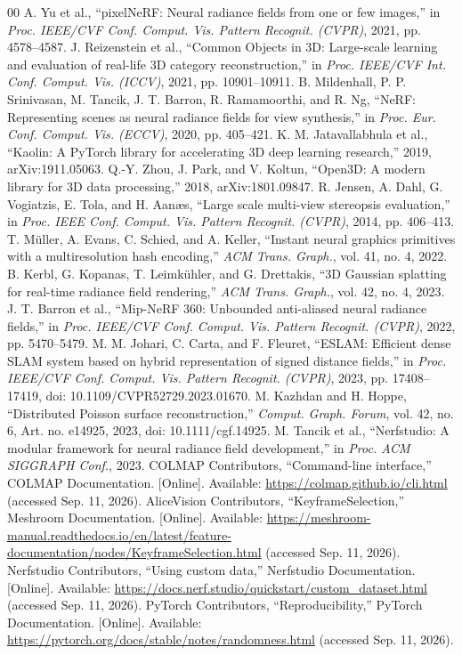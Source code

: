 \documentclass[conference]{IEEEtran}
\begin{document}
\begin{thebibliography}{00}
 A. Yu et al., ``pixelNeRF: Neural radiance fields from one or few images,'' in \textit{Proc. IEEE/CVF Conf. Comput. Vis. Pattern Recognit. (CVPR)}, 2021, pp. 4578--4587.
 J. Reizenstein et al., ``Common Objects in 3D: Large-scale learning and evaluation of real-life 3D category reconstruction,'' in \textit{Proc. IEEE/CVF Int. Conf. Comput. Vis. (ICCV)}, 2021, pp. 10901--10911.
 B. Mildenhall, P. P. Srinivasan, M. Tancik, J. T. Barron, R. Ramamoorthi, and R. Ng, ``NeRF: Representing scenes as neural radiance fields for view synthesis,'' in \textit{Proc. Eur. Conf. Comput. Vis. (ECCV)}, 2020, pp. 405--421.
 K. M. Jatavallabhula et al., ``Kaolin: A PyTorch library for accelerating 3D deep learning research,'' 2019, arXiv:1911.05063.
 Q.-Y. Zhou, J. Park, and V. Koltun, ``Open3D: A modern library for 3D data processing,'' 2018, arXiv:1801.09847.
 R. Jensen, A. Dahl, G. Vogiatzis, E. Tola, and H. Aan\ae s, ``Large scale multi-view stereopsis evaluation,'' in \textit{Proc. IEEE Conf. Comput. Vis. Pattern Recognit. (CVPR)}, 2014, pp. 406--413.
 T. M\"uller, A. Evans, C. Schied, and A. Keller, ``Instant neural graphics primitives with a multiresolution hash encoding,'' \textit{ACM Trans. Graph.}, vol. 41, no. 4, 2022.
 B. Kerbl, G. Kopanas, T. Leimk\"uhler, and G. Drettakis, ``3D Gaussian splatting for real-time radiance field rendering,'' \textit{ACM Trans. Graph.}, vol. 42, no. 4, 2023.
 J. T. Barron et al., ``Mip-NeRF 360: Unbounded anti-aliased neural radiance fields,'' in \textit{Proc. IEEE/CVF Conf. Comput. Vis. Pattern Recognit. (CVPR)}, 2022, pp. 5470--5479.
 M. M. Johari, C. Carta, and F. Fleuret, ``ESLAM: Efficient dense SLAM system based on hybrid representation of signed distance fields,'' in \textit{Proc. IEEE/CVF Conf. Comput. Vis. Pattern Recognit. (CVPR)}, 2023, pp. 17408--17419, doi: 10.1109/CVPR52729.2023.01670.
 M. Kazhdan and H. Hoppe, ``Distributed Poisson surface reconstruction,'' \textit{Comput. Graph. Forum}, vol. 42, no. 6, Art. no. e14925, 2023, doi: 10.1111/cgf.14925.
 M. Tancik et al., ``Nerfstudio: A modular framework for neural radiance field development,'' in \textit{Proc. ACM SIGGRAPH Conf.}, 2023.
 COLMAP Contributors, ``Command-line interface,'' COLMAP Documentation. [Online]. Available: \url{https://colmap.github.io/cli.html} (accessed Sep. 11, 2026).
 AliceVision Contributors, ``KeyframeSelection,'' Meshroom Documentation. [Online]. Available: \url{https://meshroom-manual.readthedocs.io/en/latest/feature-documentation/nodes/KeyframeSelection.html} (accessed Sep. 11, 2026).
 Nerfstudio Contributors, ``Using custom data,'' Nerfstudio Documentation. [Online]. Available: \url{https://docs.nerf.studio/quickstart/custom_dataset.html} (accessed Sep. 11, 2026).
 PyTorch Contributors, ``Reproducibility,'' PyTorch Documentation. [Online]. Available: \url{https://pytorch.org/docs/stable/notes/randomness.html} (accessed Sep. 11, 2026).
\end{thebibliography}
\end{document}
